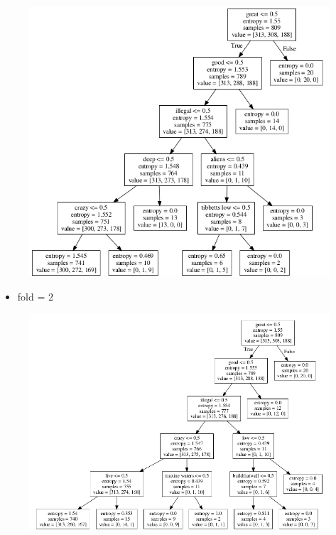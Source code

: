 \documentclass[11pt]{article}
\makeatletter
\def\maxwidth{\ifdim\Gin@nat@width>\linewidth\linewidth
    \else\Gin@nat@width\fi}
\let\Oldincludegraphics\includegraphics
\renewcommand{\includegraphics}[1]{\Oldincludegraphics[width=.8\maxwidth]{#1}}
\providecommand{\tightlist}{%
      \setlength{\itemsep}{0pt}\setlength{\parskip}{0pt}}
\makeatother
\begin{document}
\begin{figure}[H]
\centering
\includegraphics{imgs/1.png}
\caption{}
\end{figure}

\begin{itemize}
\tightlist
\item
  fold = 2
\end{itemize}

\begin{figure}[H]
\centering
\includegraphics{imgs/2.png}
\caption{}
\end{figure}
\end{document}
